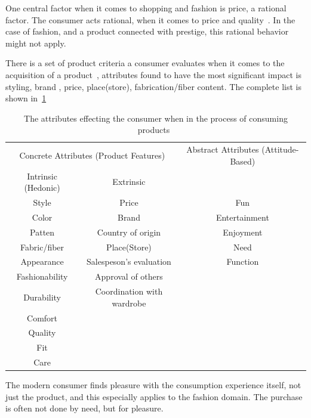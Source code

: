   One central factor when it comes to shopping and fashion is price, a rational factor.
  The consumer acts rational, when it comes to price and quality~\cite{Hanf1994}.
  In the case of fashion, and a product connected with prestige, this rational
  behavior might not apply.

  There is a set of product criteria a consumer evaluates when it comes to the
  acquisition of a product~\cite{dutton2006}, attributes found to have the most
  significant impact is styling, brand , price, place(store), fabrication/fiber
  content.  The complete list is shown in~\ref{table:ConsumersPurchaseDec}

  
  \begin{table}[H]
      \centering
      \begin{tabular}{ccc}
      \toprule
        \multicolumn{2}{c}{Concrete Attributes (Product Features)} & Abstract Attributes (Attitude-Based) \\ 
        \cmidrule(r{1em}){1-2}
        \multicolumn{1}{c}{Intrinsic (Hedonic)} & \multicolumn{1}{c}{Extrinsic} 				 	& \\ \midrule
        Style 				& Price						 	& Fun \\
        Color				& Brand 					 	& Entertainment \\
        Patten 				& Country of origin			 	& Enjoyment\\
        Fabric/fiber 		& Place(Store) 				 	& Need \\
        Appearance	   	 	& Salespeson's evaluation	 	&  Function\\
        Fashionability  	& Approval of others 		 	&\\
        Durability			& Coordination with wardrobe 	&\\
        Comfort				&								& \\
        Quality				&								& \\
        Fit					&								& \\
        Care 				&								& \\
      \bottomrule
      \end{tabular}
      \caption[Consumers' Purchase Decisions]{The attributes effecting the consumer when in the process of consuming products~\cite{dutton2006}}
      \label{table:ConsumersPurchaseDec}
  \end{table}

  The modern consumer finds pleasure with the consumption experience itself, not
  just the product, and this especially applies to the fashion domain.  The
  purchase is often not done by need, but for pleasure.

